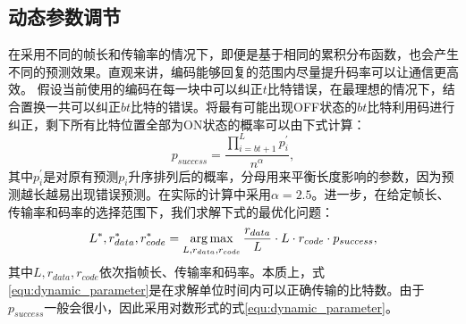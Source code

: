\subsection{动态参数调节}

在采用不同的帧长和传输率的情况下，即便是基于相同的累积分布函数，也会产生不同的预测效果。直观来讲，编码能够回复的范围内尽量提升码率可以让通信更高效。
假设当前使用的编码在每一块中可以纠正$t$比特错误，在最理想的情况下，结合置换一共可以纠正$bt$比特的错误。将最有可能出现OFF状态的$bt$比特利用码进行纠正，剩下所有比特位置全部为ON状态的概率可以由下式计算：
\begin{equation}
p_{success} = \frac{\prod_{i = bt+1}^{L} p_i^{'}}{n^\alpha},
\end{equation}
其中$p_i^{'}$是对原有预测$p_i$升序排列后的概率，分母用来平衡长度影响的参数，因为预测越长越易出现错误预测。在实际的计算中采用$\alpha=2.5$。进一步，在给定帧长、传输率和码率的选择范围下，我们求解下式的最优化问题：
\begin{equation}
\label{equ:dynamic_parameter}
L^\ast, r_{data}^\ast, r_{code}^\ast = \operatorname*{arg\,max}_{L, r_{data}, r_{code}} \frac{r_{data}}{L}\cdot L\cdot r_{code} \cdot p_{success},
\end{equation}
其中$L,r_{data},r_{code}$依次指帧长、传输率和码率。本质上，式\ref{equ:dynamic_parameter}是在求解单位时间内可以正确传输的比特数。由于$p_{success}$一般会很小，因此采用对数形式的式\ref{equ:dynamic_parameter}。